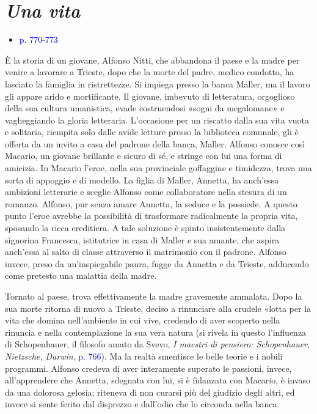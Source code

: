 \documentclass[a4paper, twoside, titlepage]{book}
\newcommand{\elenco}[1]{%
\begin{itemize}
#1
\end{itemize}}
\renewcommand{\emph}[1]{\textcolor{blue}{#1}}
\begin{document}
\chapter{\textit{Una vita}}
\elenco{\item \emph{p. 770-773}}

È la storia di un giovane, Alfonso Nitti, che abbandona il paese e la madre per venire a lavorare a Trieste, dopo che la morte del padre, medico condotto, ha lasciato la famiglia in ristrettezze. Si impiega presso la banca Maller, ma il lavoro gli appare arido e mortificante. Il giovane, imbevuto di letteratura, orgoglioso della sua cultura umanistica, evade costruendosi «sogni da megalomane» e vagheggiando la gloria letteraria.
L'occasione per un riscatto dalla sua vita vuota e solitaria, riempita solo dalle avide letture presso la biblioteca comunale, gli è offerta da un invito a casa del padrone della banca, Maller. Alfonso conosce così Macario, un giovane brillante e sicuro di sé, e stringe con lui una forma di amicizia. In Macario l'eroe, nella sua provinciale goffaggine e timidezza, trova una sorta di appoggio e di modello. La figlia di Maller, Annetta, ha anch'essa ambizioni letterarie e sceglie Alfonso come collaboratore nella stesura di un romanzo. Alfonso, pur senza amare Annetta, la seduce e la possiede. A questo punto l'eroe avrebbe la possibilità di trasformare radicalmente la propria vita, sposando la ricca ereditiera. A tale soluzione è spinto insistentemente dalla signorina Francesca, istitutrice in casa di Maller e sua amante, che aspira anch'essa al salto di classe attraverso il matrimonio con il padrone. Alfonso invece, preso da un'inspiegabile paura, fugge da Annetta e da Trieste, adducendo come pretesto una malattia della madre.

Tornato al paese, trova effettivamente la madre gravemente ammalata. Dopo la sua morte ritorna di nuovo a Trieste, deciso a rinunciare alla crudele «lotta per la vita che domina nell'ambiente in cui vive, credendo di aver scoperto nella rinuncia e nella contemplazione la sua vera natura (si rivela in questo l'influenza di Schopenhauer, il filosofo amato da Svevo, \textit{I maestri di pensiero: Schopenhauer, Nietzsche, Darwin}, \emph{p. 766}). Ma la realtà smentisce le belle teorie e i nobili programmi. Alfonso credeva di aver interamente superato le passioni, invece, all'apprendere che Annetta, sdegnata con lui, si è fidanzata con Macario, è invaso da una dolorosa gelosia; riteneva di non curarsi più del giudizio degli altri, ed invece si sente ferito dal disprezzo e dall'odio che lo circonda nella banca.
\end{document}
